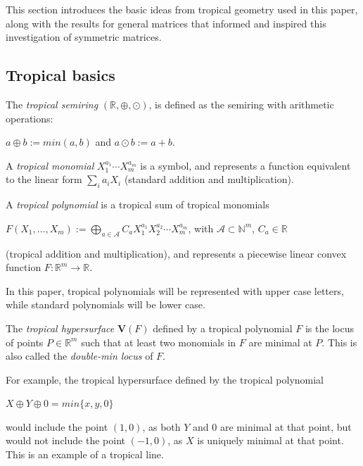 \documentclass{article}
\begin{document}
This section introduces the basic ideas from tropical geometry used in this paper, along with the results for general matrices that informed and inspired this investigation of symmetric matrices.

\subsection{Tropical basics}

The \emph{tropical semiring} $(\mathbb{R}, \oplus, \odot)$, is defined as the semiring with arithmetic operations:
\begin{center}
  $a \oplus b := min(a,b)$ \hspace{.1 in} and \hspace{.1 in} $a \odot b := a + b$.
\end{center}

A \emph{tropical monomial} $X_{1}^{a_{1}} \cdots X_{m}^{a_{m}}$ is a symbol, and represents a function equivalent to the linear form $\sum_{i} a_{i}X_{i}$ (standard addition and multiplication). 

A \emph{tropical polynomial} is a tropical sum of tropical monomials  
  \begin{center}
    $F(X_{1},\ldots,X_{m}) := \bigoplus_{a \in \mathcal{A}}C_{a}X_{1}^{a_{1}}X_{2}^{a_{2}} \cdots X_{m}^{a_{m}}$, \hspace{.1 in} with $\mathcal{A} \subset \mathbb{N}^{m}$, $C_{a} \in \mathbb{R}$
  \end{center}
  (tropical addition and multiplication), and represents a piecewise linear convex function $F: \mathbb{R}^{m} \rightarrow \mathbb{R}$. 

In this paper, tropical polynomials will be represented with upper case letters, while standard polynomials will be lower case.

The \emph{tropical hypersurface} $\textbf{V}(F)$ defined by a tropical polynomial $F$ is the locus of points $P \in \mathbb{R}^{m}$ such that at least two monomials in $F$ are minimal at $P$. This is also called the \emph{double-min locus} of $F$.

For example, the tropical hypersurface defined by the tropical polynomial
\begin{center}
  $X \oplus Y \oplus 0  = min\{x,y,0\}$
\end{center}
would include the point $(1,0)$, as both $Y$ and $0$ are minimal at that point, but would not include the point $(-1,0)$, as $X$ is uniquely minimal at that point. This is an example of a tropical line.
\end{document}
